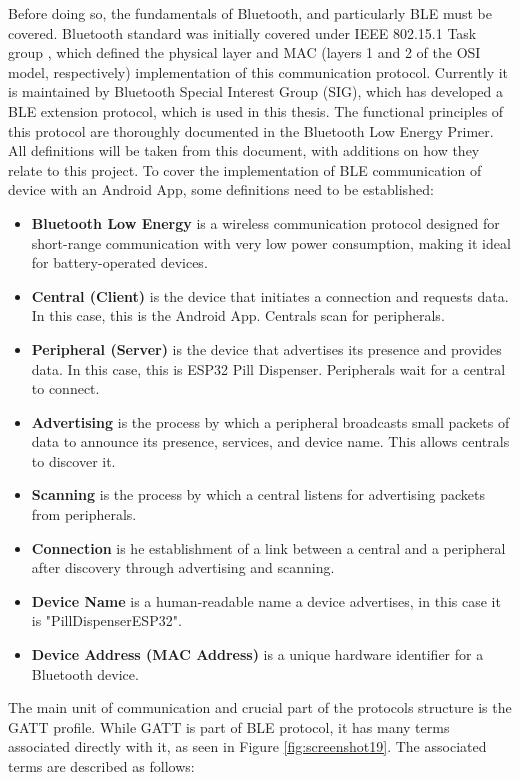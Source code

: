Before doing so, the fundamentals of Bluetooth, and particularly \ac{BLE} must be covered. Bluetooth standard was initially covered under IEEE 802.15.1 Task group \cite{1016473}, which defined the physical layer and \ac{MAC} (layers 1 and 2 of the \ac{OSI} model, respectively) implementation of this communication protocol. Currently it is maintained by Bluetooth Special Interest Group (SIG), which has developed a \ac{BLE} extension protocol, which is used in this thesis. The functional principles of this protocol are thoroughly documented in the Bluetooth Low Energy Primer\cite{ble_primer_2024}. All definitions will be taken from this document, with additions on how they relate to this project. To cover the implementation of \ac{BLE} communication of device with an Android App, some definitions need to be established:
\begin{itemize}
	\item \textbf{Bluetooth Low Energy} is a wireless communication protocol designed for short-range communication with very low power consumption, making it ideal for battery-operated devices. 
	\item \textbf{Central (Client)} is the device that initiates a connection and requests data. In this case, this is the Android App. Centrals scan for peripherals.
	\item \textbf{Peripheral (Server)} is the device that advertises its presence and provides data. In this case, this is ESP32 Pill Dispenser. Peripherals wait for a central to connect.
	\item \textbf{Advertising} is the process by which a peripheral broadcasts small packets of data to announce its presence, services, and device name. This allows centrals to discover it. 
	\item \textbf{Scanning} is the process by which a central listens for advertising packets from peripherals.
	\item \textbf{Connection} is he establishment of a link between a central and a peripheral after discovery through advertising and scanning.
	\item \textbf{Device Name} is a human-readable name a device advertises, in this case it is "PillDispenserESP32".
	\item \textbf{Device Address (MAC Address)} is a unique hardware identifier for a Bluetooth device.
\end{itemize}
The main unit of communication and crucial part of the protocols structure is the \ac{GATT} profile. While \ac{GATT} is part of \ac{BLE} protocol, it has many terms associated directly with it, as seen in Figure \ref{fig:screenshot19}. The associated terms are described as follows:

